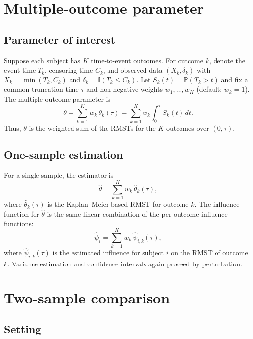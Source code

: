 \documentclass[11pt]{article}
\begin{document}
\section{Multiple-outcome parameter}

\subsection{Parameter of interest}

Suppose each subject has $K$ time-to-event outcomes. For outcome $k$, denote the event time $T_k$, censoring time $C_k$, and observed data $(X_k, \delta_k)$ with $X_k = \min(T_k, C_k)$ and $\delta_k = \mathbb{I}(T_k \leq C_k)$. Let $S_k(t) = \mathbb{P}(T_k > t)$ and fix a common truncation time $\tau$ and non-negative weights $w_1, \ldots, w_K$ (default: $w_k = 1$). The multiple-outcome parameter is
\begin{equation}
  \theta = \sum_{k=1}^K w_k\,\theta_k(\tau) = \sum_{k=1}^K w_k \int_0^{\tau} S_k(t)\,dt.
\end{equation}
Thus, $\theta$ is the weighted sum of the RMSTs for the $K$ outcomes over $(0, \tau)$.

\subsection{One-sample estimation}

For a single sample, the estimator is
\begin{equation}
  \widehat{\theta} = \sum_{k=1}^K w_k\,\widehat{\theta}_k(\tau),
\end{equation}
where $\widehat{\theta}_k(\tau)$ is the Kaplan--Meier-based RMST for outcome $k$. The influence function for $\widehat{\theta}$ is the same linear combination of the per-outcome influence functions:
\begin{equation}
  \hat{\psi}_i = \sum_{k=1}^K w_k\,\hat{\psi}_{i,k}(\tau),
\end{equation}
where $\hat{\psi}_{i,k}(\tau)$ is the estimated influence for subject $i$ on the RMST of outcome $k$. Variance estimation and confidence intervals again proceed by perturbation.

\section{Two-sample comparison}

\subsection{Setting}
\end{document}
